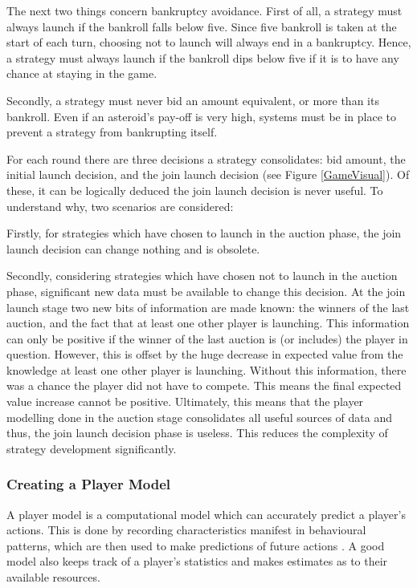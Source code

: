 \documentclass[11pt, twoside]{article}
\begin{document}
The next two things concern bankruptcy avoidance. First of all, a strategy must always launch if the bankroll falls below five. Since five bankroll is taken at the start of each turn, choosing not to launch will always end in a bankruptcy. Hence, a strategy must always launch if the bankroll dips below five if it is to have any chance at staying in the game.

Secondly, a strategy must never bid an amount equivalent, or more than its bankroll. Even if an asteroid's pay-off is very high, systems must be in place to prevent a strategy from bankrupting itself.

For each round there are three decisions a strategy consolidates: bid amount, the initial launch decision, and the join launch decision (see Figure \ref{GameVisual}). Of these, it can be logically deduced the join launch decision is never useful. To understand why, two scenarios are considered:

Firstly, for strategies which have chosen to launch in the auction phase, the join launch decision can change nothing and is obsolete.

Secondly, considering strategies which have chosen not to launch in the auction phase, significant new data must be available to change this decision. At the join launch stage two new bits of information are made known: the winners of the last auction, and the fact that at least one other player is launching. This information can only be positive if the winner of the last auction is (or includes) the player in question. However, this is offset by the huge decrease in expected value from the knowledge at least one other player is launching. Without this information, there was a chance the player did not have to compete. This means the final expected value increase cannot be positive. Ultimately, this means that the player modelling done in the auction stage consolidates all useful sources of data and thus, the join launch decision phase is useless. This reduces the complexity of strategy development significantly.

\subsubsection*{Creating a Player Model}
A player model is a computational model which can accurately predict a player's actions. This is done by recording characteristics manifest in behavioural patterns, which are then used to make predictions of future actions \cite{yannakakis2013player}. A good model also keeps track of a player's statistics and makes estimates as to their available resources.
\end{document}
